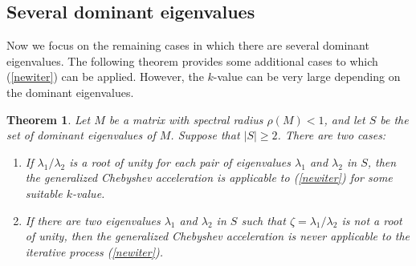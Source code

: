 \documentclass[reqno]{amsart}
\numberwithin{equation}{section}
\theoremstyle{plain}
\newtheorem{theorem}{Theorem}
\theoremstyle{definition}
\begin{document}
\subsection{Several dominant eigenvalues} Now we focus on the remaining cases in which there are several dominant eigenvalues. The following theorem provides some additional cases to which (\ref{newiter}) can be applied. However, the $k$-value can be very large depending on the dominant eigenvalues.
\begin{theorem}\label{exclude}
Let $M$ be a matrix with spectral radius $\rho(M)<1$, and let $S$ be the set of dominant eigenvalues of $M$. Suppose that $|S|\geq 2$. There are two cases:
\begin{enumerate}
	\item If $\lambda_1/\lambda_2$ is a root of unity for each pair of eigenvalues $\lambda_{1}$ and $\lambda_2$ in $S$, then the generalized Chebyshev acceleration is applicable to (\ref{newiter}) for some suitable $k$-value.
	\item If there are two eigenvalues $\lambda_{1}$ and $\lambda_2$ in $S$ such that $\zeta= \lambda_1/\lambda_2$ is not a root of unity, then the generalized Chebyshev acceleration is never applicable to the iterative process (\ref{newiter}).
\end{enumerate}
\end{theorem}
\end{document}

